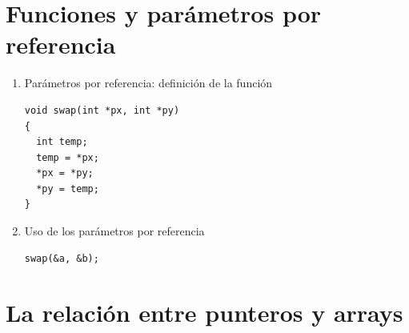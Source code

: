 \documentclass[a4paper,oneside]{article}
\begin{document}
\section{Funciones y parámetros por referencia}

  \begin{enumerate}
  \item Parámetros por referencia: definición de la función

    \begin{verbatim}
void swap(int *px, int *py)
{
  int temp;
  temp = *px;
  *px = *py;
  *py = temp;
}
    \end{verbatim}

  \item Uso de los parámetros por referencia

    \begin{verbatim}
swap(&a, &b);
    \end{verbatim}

  \end{enumerate}

\section{La relación entre punteros y arrays}
\end{document}
